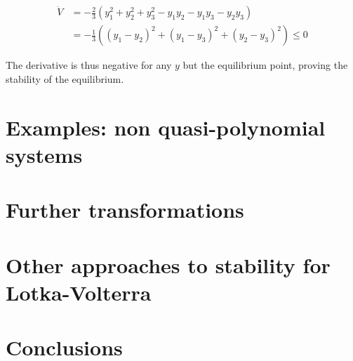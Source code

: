 \documentclass{article}
\begin{document}
\begin{equation}
\begin{aligned}
\dot{V} &= -\frac{2}{3} \left(y_1^2 + y_2^2 + y_3^2 - y_1 y_2 -y_1 y_3 - y_2 y_3 \right) \\
&=-\frac{1}{3} \left((y_1 - y_2)^2 + (y_1 - y_3)^2 + (y_2 - y_3)^2\right) \leq 0
\end{aligned}
\end{equation}

The derivative is thus negative for any \(y\) but the equilibrium point,
proving the stability of the equilibrium.

\hypertarget{examples-non-quasi-polynomial-systems}{%
\section{Examples: non quasi-polynomial
systems}\label{examples-non-quasi-polynomial-systems}}

\hypertarget{further-transformations}{%
\section{Further transformations}\label{further-transformations}}

\hypertarget{other-approaches-to-stability-for-lotka-volterra}{%
\section{Other approaches to stability for
Lotka-Volterra}\label{other-approaches-to-stability-for-lotka-volterra}}

\hypertarget{conclusions}{%
\section*{Conclusions}\label{conclusions}}
\end{document}
